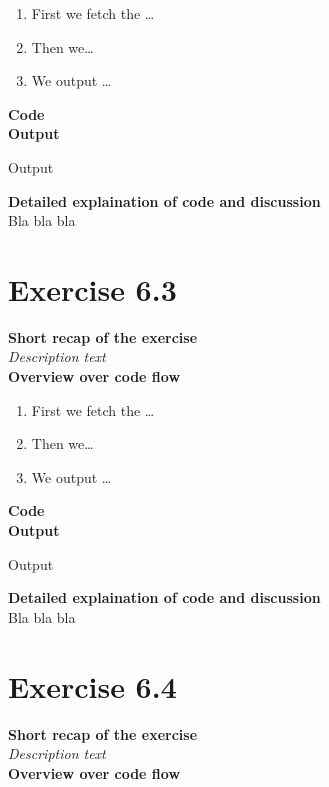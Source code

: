 \documentclass{article}
\newcommand\pythonstyle{\lstset{
language=python,
breaklines=true,
basicstyle=\ttfamily\small,
otherkeywords={1, 2, 3, 4, 5, 6, 7, 8 ,9 , 0, -, =, +, [, ], (, ), \{, \}, :, *, !},             %
keywordstyle=\color{blue},
emph={class, pass, in, for, while, if, is, elif, else, not, and, or, OR
    def, print, exec, break, continue, return},
emphstyle=\color{black}\bfseries,
emph={[2]True, False, None, self},
emphstyle=[2]\color{purple},
emph={[3]from, import, as},
emphstyle=[3]\color{blue},
stringstyle=\color{red},
frame=tb,
showstringspaces=false,
morecomment=[s]{"""}{"""},
commentstyle=\color{gray},
rulesepcolor=\color{blue},
title=\lstname
}}
\newcommand\pythonexternal[2][]{{
\pythonstyle
}}
\begin{document}
\begin{enumerate}
  \item First we fetch the \ldots
  \item Then we\ldots
  \item We output \ldots\\
\end{enumerate}

\textbf{Code}\\
\textbf{Output}
\begin{pythonOutput}
Output
\end{pythonOutput}
\textbf{Detailed explaination of code and discussion}\\
Bla bla bla

\section{Exercise 6.3}
\textbf{Short recap of the exercise}\\
\textit{Description text}\\

\textbf{Overview over code flow}\\

\begin{enumerate}
  \item First we fetch the \ldots
  \item Then we\ldots
  \item We output \ldots\\
\end{enumerate}

\textbf{Code}\\
\textbf{Output}
\begin{pythonOutput}
Output
\end{pythonOutput}
\textbf{Detailed explaination of code and discussion}\\
Bla bla bla
\section{Exercise 6.4}
\textbf{Short recap of the exercise}\\
\textit{Description text}\\

\textbf{Overview over code flow}\\
\end{document}
